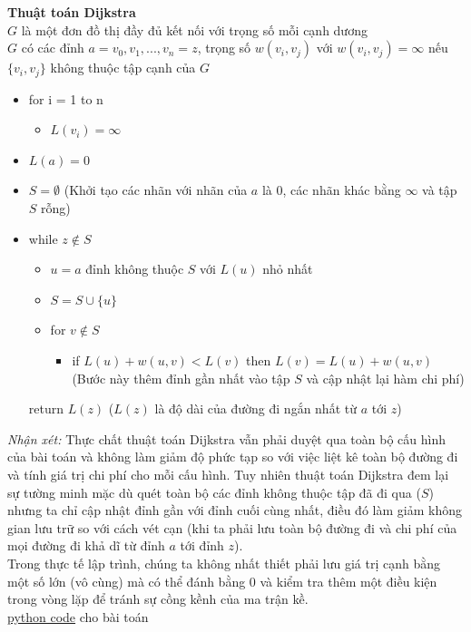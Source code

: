\begin{tcolorbox}[colframe=gray,colback=gray!20,left=10pt,right=10pt,top=10pt,bottom=10pt]
    \textbf{Thuật toán Dijkstra} \\
    $G$ là một đơn đồ thị đầy đủ kết nối với trọng số mỗi cạnh dương \\
    $G$ có các đỉnh $a = v_0, v_1, ..., v_n = z$, trọng số 
    $w(v_i, v_j)$ với $w(v_i, v_j) = \infty$ nếu $\{v_i, v_j\}$ không thuộc 
    tập cạnh của $G$

    \begin{itemize}
        \item [] for i = 1 to n 
        \begin{itemize}
            \item [] $L(v_i) = \infty$
        \end{itemize} 
        \item [] $L(a) = 0$
        \item [] $S = \emptyset $ (Khởi tạo các nhãn với nhãn của $a$ là $0$, 
        các nhãn khác bằng $\infty$ và tập $S$ rỗng)
        \item [] while $z \notin S$
        \begin{itemize}
          \item [] $u = a$ đỉnh không thuộc $S$ với $L(u)$ nhỏ nhất
          \item [] $S = S \cup \{u\}$
          \item [] for $v \notin S$
          \begin{itemize}
            \item [] if $L(u) + w(u,v) < L(v)$ then $L(v) = L(u) + w(u,v)$
            (Bước này thêm đỉnh gần nhất vào tập $S$ và cập nhật lại hàm chi phí)
          \end{itemize}
        \end{itemize}
        return $L(z)$ ($L(z)$ là độ dài của đường đi ngắn nhất từ $a$ tới $z$)
    \end{itemize}
  \end{tcolorbox}

\textit{Nhận xét: } Thực chất thuật toán Dijkstra vẫn phải duyệt qua toàn bộ cấu 
hình của bài toán và không làm giảm độ phức tạp so với việc liệt kê toàn bộ đường
đi và tính giá trị chi phí cho mỗi cấu hình. Tuy nhiên thuật toán Dijkstra đem lại
sự tường minh mặc dù quét toàn bộ các đỉnh không thuộc tập đã đi qua ($S$) nhưng 
ta chỉ cập nhật đỉnh gần với đỉnh cuối cùng nhất, điều đó làm giảm không gian lưu 
trữ so với cách vét cạn (khi ta phải lưu toàn bộ đường đi và chi phí của mọi đường
đi khả dĩ từ đỉnh $a$ tới đỉnh $z$). \\

Trong thực tế lập trình, chúng ta không nhất thiết phải lưu giá trị cạnh bằng một 
số lớn (vô cùng) mà có thể đánh bằng $0$ và kiểm tra thêm một điều kiện trong vòng 
lặp để tránh sự cồng kềnh của ma trận kề. \\

\href{https://github.com/batman0911/dma_homework/blob/master/hw_01/src/dynamic_programming.ipynb}{python code} 
    cho bài toán
